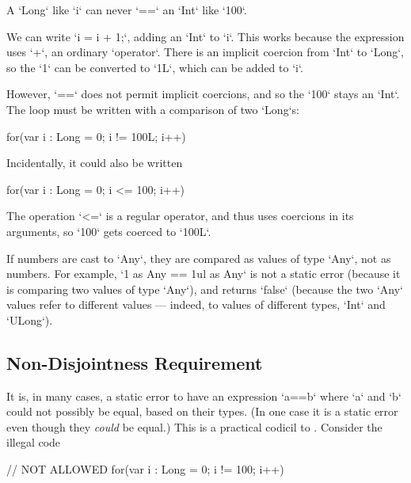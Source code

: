 A \xcd`Long` like \xcd`i` can never \xcd`==` an \xcd`Int` like \xcd`100`.

We can write \xcd`i = i + 1;`, adding an \xcd`Int` to \xcd`i`. This works 
because the expression uses \xcd`+`,  an ordinary \xcd`operator`.
There is an implicit coercion from \xcd`Int` to \xcd`Long`, so the
\xcd`1` can be converted to \xcd`1L`, which can be added to \xcd`i`.  

However, \xcd`==` does not permit implicit coercions, and so the \xcd`100`
stays an \xcd`Int`.  The loop must be written with a comparison of two
\xcd`Long`s: 
\begin{xten}
for(var i : Long = 0; i != 100L; i++) {}
\end{xten}




Incidentally, it could also be written 
\begin{xten}
for(var i : Long = 0; i <= 100; i++) {}
\end{xten}

\begin{xten}

\end{xten}
The operation \xcd`<=` is a regular operator, and thus uses coercions in its
arguments, so \xcd`100` gets coerced to \xcd`100L`.  

\begin{ex}
If numbers are cast to \xcd`Any`, they are compared as values of type
\xcd`Any`, not as numbers.  
For example, \xcd`1 as Any == 1ul as Any`
is not a static error (because it is comparing two values of type \xcd`Any`),
and returns \xcd`false` (because the two \xcd`Any` values refer to different
values --- indeed, to values of different types, \xcd`Int` and \xcd`ULong`).

\end{ex}


\subsection{Non-Disjointness Requirement}

It is, in many cases, a static error to have an expression \xcd`a==b` where \xcd`a` and
\xcd`b` could not possibly be equal, based on their types.  (In one case it is
a static error even though they {\em could} be equal.)
This is a
practical codicil to .  Consider the illegal code 
\begin{xten}
// NOT ALLOWED
for(var i : Long = 0; i != 100; i++) 
\end{xten}

